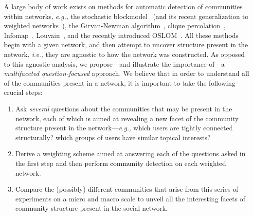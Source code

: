 A large body of work exists on methods for automatic detection of communities within networks, {\it e.g.,} the stochastic blockmodel~\cite{Holland1983} (and its recent generalization to weighted networks~\cite{Aicher26062014}), the Girvan-Newman algorithm~\cite{newman2004finding}, clique percolation~\cite{PalEtAl05}, Infomap~\cite{Rosvall08mapsof}, Louvain~\cite{blondel2008fast}, and the recently introduced OSLOM~\cite{LancichinettiPlos}.
All these methods begin with a given network, and then attempt to uncover structure present in the network, \emph{i.e.,} they are agnostic to how the network was constructed.
As opposed to this agnostic analysis, we propose---and illustrate the importance of---a \emph{multifaceted question-focused} approach. We believe that in order to understand all of the communities present in a network, it is important to take the following crucial steps: 
\begin{enumerate}

\item Ask \emph{several} questions about the communities that may be present in the network, each of which is aimed at revealing a new facet of the community structure present in the network---{\it e.g.,} which users are tightly connected structurally? which groups of users have similar topical interests?

\item Derive a weighting scheme aimed at answering each of the questions asked in the first step and then perform community detection on each weighted network.
\item Compare the (possibly) different communities that arise from this series of experiments on a micro and macro scale to unveil all the interesting facets of community structure present in the social network. 
\end{enumerate}

